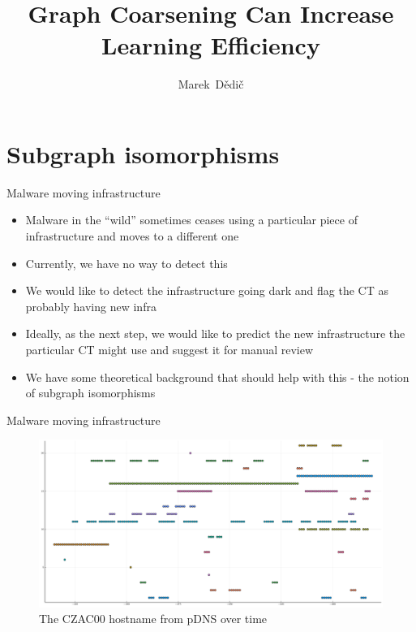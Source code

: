 \documentclass[10pt]{beamer}
\title[DDny KM FJFI 2021]
{
	Graph Coarsening Can Increase Learning Efficiency
}
\date[November 2021]{\displaydate{presentation}}
\author[Marek Dědič]
{
	Marek~Dědič
}
\institute[Cisco]{}
\begin{document}
\begin{frame}
	\titlepage
\end{frame}


\section{Subgraph isomorphisms}

\begin{frame}{Malware moving infrastructure}
	\begin{itemize}
		\item Malware in the \enquote{wild} sometimes ceases using a particular piece of infrastructure and moves to a different one
		\item Currently, we have no way to detect this
		\item We would like to detect the infrastructure going dark and flag the CT as probably having new infra
		\item Ideally, as the next step, we would like to predict the new infrastructure the particular CT might use and suggest it for manual review
		\item We have some theoretical background that should help with this - the notion of subgraph isomorphisms
	\end{itemize}
\end{frame}

\begin{frame}{Malware moving infrastructure}
	\begin{figure}
		\centering
		\includegraphics[width=\textwidth]{images/CZAC00-swflows-passivednshostname0/CZAC00-swflows-passivednshostname0.pdf}
		\caption{The CZAC00 hostname from pDNS over time}
	\end{figure}
\end{frame}
\end{document}
